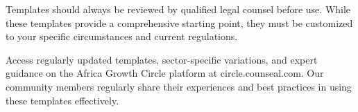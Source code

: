 \begin{warningbox}
Templates should always be reviewed by qualified legal counsel before use. While these templates provide a comprehensive starting point, they must be customized to your specific circumstances and current regulations.
\end{warningbox}

\begin{communitybox}
Access regularly updated templates, sector-specific variations, and expert guidance on the Africa Growth Circle platform at circle.counseal.com. Our community members regularly share their experiences and best practices in using these templates effectively.
\end{communitybox}